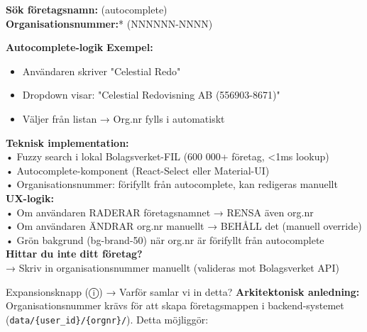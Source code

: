 \documentclass[10pt]{beamer}
\begin{document}
\begin{frame}[label=intro]
  \vspace{0.2cm}
  \footnotesize
  
  \textbf{Sök företagsnamn:} \underline{\hspace{6cm}} (autocomplete)\\[0.2cm]
  
  \textbf{Organisationsnummer:}* \underline{\hspace{4cm}} (NNNNNN-NNNN)
  
  \begin{block}{\textbf{Autocomplete-logik}}
    \tiny
    \textbf{Exempel:}
    \begin{itemize}
      \item Användaren skriver "Celestial Redo"
      \item Dropdown visar: "Celestial Redovisning AB (556903-8671)"
      \item Väljer från listan → Org.nr fylls i automatiskt
    \end{itemize}
    \vspace{0.1cm}
    
    \tiny \textbf{Teknisk implementation:}\\[0.1cm]
    \tiny • Fuzzy search i lokal Bolagsverket-FIL (600 000+ företag, <1ms lookup)\\[0.1cm]
    \tiny • Autocomplete-komponent (React-Select eller Material-UI)\\[0.1cm]
    \tiny • Organisationsnummer: förifyllt från autocomplete, kan redigeras manuellt\\[0.2cm]
    
    \tiny \textbf{UX-logik:}\\[0.1cm]
    \tiny • Om användaren RADERAR företagsnamnet → RENSA även org.nr\\[0.1cm]
    \tiny • Om användaren ÄNDRAR org.nr manuellt → BEHÅLL det (manuell override)\\[0.1cm]
    \tiny • Grön bakgrund (bg-brand-50) när org.nr är förifyllt från autocomplete\\[0.2cm]
    
    \tiny \textbf{Hittar du inte ditt företag?}\\[0.1cm]
    \tiny → Skriv in organisationsnummer manuellt (valideras mot Bolagsverket API)
  \end{block}
  
  \begin{alertblock}{Expansionsknapp (ⓘ) → Varför samlar vi in detta?}
    \tiny \textbf{Arkitektonisk anledning:}\\[0.1cm]
    \tiny Organisationsnummer krävs för att skapa företagsmappen i backend-systemet\\[0.1cm]
    \tiny (\texttt{data/\{user\_id\}/\{orgnr\}/}). Detta möjliggör:\\[0.2cm]
    

\end{alertblock}
\end{frame}
\end{document}

